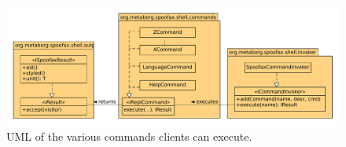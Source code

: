 \section{}
\label{sec:commands}

\begin{figure}[h]
  \centering
  \includegraphics[width=\textwidth]{uml-commands}
  \caption{UML of the various commands clients can execute.}
\end{figure}

\section{}
\label{sec:function-comp}

\section{}
\label{sec:visitor}

\section{}
\label{sec:eval-strat}

